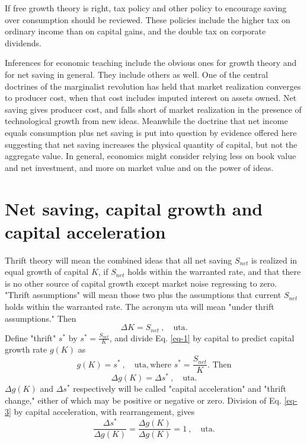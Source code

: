 \documentclass[a4paper,fleqn]{latex_styles/cas-sc}
\begin{document}
If free growth theory is right, tax policy and other policy to encourage
saving over consumption should be reviewed. These policies
include the higher tax on ordinary income than on capital gains, and the
double tax on corporate dividends.

Inferences for economic teaching include the obvious ones for growth
theory and for net saving in general. They include others as well.
One of the central doctrines of the marginalist revolution has held that
market realization converges to producer cost, when that cost includes
imputed interest on assets owned. Net saving gives producer cost,
and falls short of market realization in the presence of technological
growth from new ideas. Meanwhile the doctrine that net income equals
consumption plus net saving is put into question by evidence offered
here suggesting that net saving increases the physical quantity of
capital, but not the aggregate value. In general, economics might
consider relying less on book value and net investment, and more on market value and on the
power of ideas.

\hypertarget{net-saving-and-capital-growth}{%
\section{Net saving, capital growth and capital acceleration}\label{net-saving-and-capital-growth}}

Thrift theory will mean the combined ideas that all net saving \(S_{net}\) is realized in equal growth of capital \(K\), if \(S_{net}\) holds within the warranted rate, and that there is no other source of capital growth except market noise regressing to zero. "Thrift assumptions" will mean those two plus the assumptions that current \(S_{net}\) holds within the warranted rate. The acronym uta will mean "under thrift assumptions." Then 
%
\begin{equation}
    \Delta K = S_{net}\ ,\quad \text{uta}. \label{eq-1}
\end{equation}
%
Define "thrift" \(s^*\) by \(s^* = \frac{S_{net}}{K}\), and divide Eq. \eqref{eq-1} by capital to predict capital growth rate \(g(K)\) as
%
\begin{equation}
g(K) = s^* \ , \quad \text{uta}, \text{where } s^* = \frac{S_{net}}{K}. \text{ Then} \label{eq-2}
\end{equation}
%
\begin{equation}
\Delta g(K) = \Delta s^*\ , \quad \text{uta.} \label{eq-3}
\end{equation}
%
\(\Delta g(K)\) and \(\Delta s^*\) respectively will be called "capital acceleration" and "thrift change," either of which may be positive or negative or zero. Division of Eq. \eqref{eq-3} by capital acceleration, with rearrangement, gives
%
\begin{equation}
\frac{\Delta s^*}{\Delta g(K)} = \frac{\Delta g(K)}{\Delta g(K)} = 1\ , \quad \text{uta}. \label{eq-4}
\end{equation}
%
\end{document}
